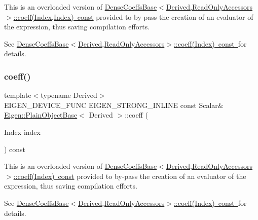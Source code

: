 This is an overloaded version of \mbox{\hyperlink{class_eigen_1_1_dense_coeffs_base_3_01_derived_00_01_read_only_accessors_01_4_ad41647ef695f9a5a58a9a0f50e2ae064}{Dense\+Coeffs\+Base$<$\+Derived,\+Read\+Only\+Accessors$>$\+::coeff(\+Index,\+Index) const}} provided to by-\/pass the creation of an evaluator of the expression, thus saving compilation efforts.

See \mbox{\hyperlink{class_eigen_1_1_dense_coeffs_base_3_01_derived_00_01_read_only_accessors_01_4_ad52344ad1f42852db71996590d2de0de}{Dense\+Coeffs\+Base$<$\+Derived,\+Read\+Only\+Accessors$>$\+::coeff(\+Index) const }}for details. \mbox{\label{class_eigen_1_1_plain_object_base_af592e3993ea3d4ac9f073b42db2c04cc}} 
\subsubsection{\texorpdfstring{coeff()}{coeff()}\hspace{0.1cm}{\footnotesize\ttfamily [2/2]}}
{\footnotesize\ttfamily template$<$typename Derived$>$ \\
E\+I\+G\+E\+N\+\_\+\+D\+E\+V\+I\+C\+E\+\_\+\+F\+U\+NC E\+I\+G\+E\+N\+\_\+\+S\+T\+R\+O\+N\+G\+\_\+\+I\+N\+L\+I\+NE const Scalar\& \mbox{\hyperlink{class_eigen_1_1_plain_object_base}{Eigen\+::\+Plain\+Object\+Base}}$<$ Derived $>$\+::coeff (\begin{DoxyParamCaption}\item[{Index}]{index }\end{DoxyParamCaption}) const\hspace{0.3cm}{\ttfamily [inline]}}

This is an overloaded version of \mbox{\hyperlink{class_eigen_1_1_dense_coeffs_base_3_01_derived_00_01_read_only_accessors_01_4_ad52344ad1f42852db71996590d2de0de}{Dense\+Coeffs\+Base$<$\+Derived,\+Read\+Only\+Accessors$>$\+::coeff(\+Index) const}} provided to by-\/pass the creation of an evaluator of the expression, thus saving compilation efforts.

See \mbox{\hyperlink{class_eigen_1_1_dense_coeffs_base_3_01_derived_00_01_read_only_accessors_01_4_ad52344ad1f42852db71996590d2de0de}{Dense\+Coeffs\+Base$<$\+Derived,\+Read\+Only\+Accessors$>$\+::coeff(\+Index) const }}for details. \mbox{\label{class_eigen_1_1_plain_object_base_a25626a55b26a4323565f79d1b7c48ea8}} 
